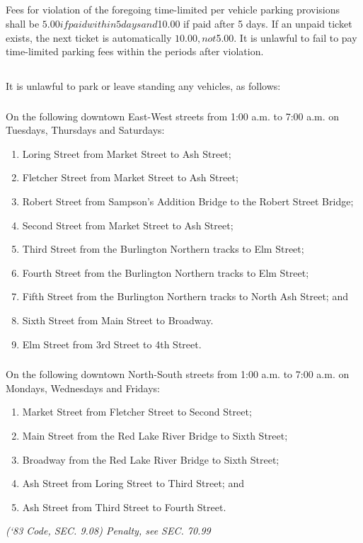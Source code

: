 \subsection{}
Fees for violation of the foregoing time-limited per vehicle parking provisions shall be $5.00 if paid within 5 days and $10.00 if paid after 5 days. If an unpaid ticket exists, the next ticket is automatically $10.00, not $5.00.  It is unlawful to fail to pay time-limited parking fees within the periods after violation.
\subsection{}
It is unlawful to park or leave standing any vehicles, as follows:
\subsubsection{}
On the following downtown East-West streets from 1:00 a.m. to 7:00 a.m. on Tuesdays, Thursdays and Saturdays:
\begin{enumerate}[{\indent}a)]
\item Loring Street from Market Street to Ash Street;
\item Fletcher Street from Market Street to Ash Street;
\item Robert Street from Sampson’s Addition Bridge to the Robert Street Bridge;
\item Second Street from Market Street to Ash Street;
\item Third Street from the Burlington Northern tracks to Elm Street;
\item Fourth Street from the Burlington Northern tracks to Elm Street;
\item Fifth Street from the Burlington Northern tracks to North Ash Street; and
\item Sixth Street from Main Street to Broadway.
\item Elm Street from 3rd Street to 4th Street.
\end{enumerate}
\subsubsection{}
On the following downtown North-South streets from 1:00 a.m. to 7:00 a.m. on Mondays, Wednesdays and Fridays:
\begin{enumerate}[{\indent}a)]
\item Market Street from Fletcher Street to Second Street;
\item Main Street from the Red Lake River Bridge to Sixth Street;
\item Broadway from the Red Lake River Bridge to Sixth Street;
\item Ash Street from Loring Street to Third Street; and
\item Ash Street from Third Street to Fourth Street.
\end{enumerate}
\emph{(‘83 Code, SEC. 9.08)  Penalty, see SEC. 70.99}

